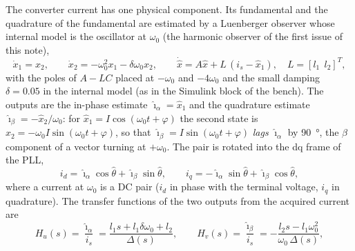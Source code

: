 \documentclass[10pt,a4paper]{scrartcl}
\newcommand{\wo}{\omega_0}
\newcommand{\ihat}{\hat{\imath}}
\newcommand{\Hu}{H_u}
\newcommand{\Hv}{H_v}
\begin{document}
\begin{onehalfspace}
The converter current has one physical component. Its fundamental and the quadrature of the fundamental are estimated by a Luenberger observer whose internal model is the oscillator at $\wo$ (the harmonic observer of the first issue of this note),
\begin{equation}
\dot x_1 = x_2, \qquad \dot x_2 = -\wo^2 x_1 - \delta\wo x_2, \qquad
\dot{\hat x} = A\hat x + L\,(i_s - \hat x_1), \quad L = [l_1\ \ l_2]^T,
\label{eq:fht_model}
\end{equation}
with the poles of $A - LC$ placed at $-\wo$ and $-4\wo$ and the small damping $\delta = 0.05$ in the internal model (as in the Simulink block of the bench). The outputs are the in-phase estimate $\ihat_\alpha = \hat x_1$ and the quadrature estimate $\ihat_\beta = -\hat x_2/\wo$: for $\hat x_1 = I\cos(\wo t + \varphi)$ the second state is $\hat x_2 = -\wo I\sin(\wo t + \varphi)$, so that $\ihat_\beta = I\sin(\wo t + \varphi)$ \emph{lags} $\ihat_\alpha$ by \SI{90}{\degree}, the $\beta$ component of a vector turning at $+\wo$. The pair is rotated into the dq frame of the PLL,
\begin{equation}
i_d = \ihat_\alpha\cos\hat\theta + \ihat_\beta\sin\hat\theta, \qquad i_q = -\ihat_\alpha\sin\hat\theta + \ihat_\beta\cos\hat\theta,
\label{eq:dq}
\end{equation}
where a current at $\wo$ is a DC pair ($i_d$ in phase with the terminal voltage, $i_q$ in quadrature). The transfer functions of the two outputs from the acquired current are
\begin{equation}
\Hu(s) = \frac{\ihat_\alpha}{i_s} = \frac{l_1 s + l_1\delta\wo + l_2}{\Delta(s)}, \qquad
\Hv(s) = \frac{\ihat_\beta}{i_s} = -\frac{l_2 s - l_1\wo^2}{\wo\,\Delta(s)},
\label{eq:fht_tf}
\end{equation}

\end{onehalfspace}
\end{document}
